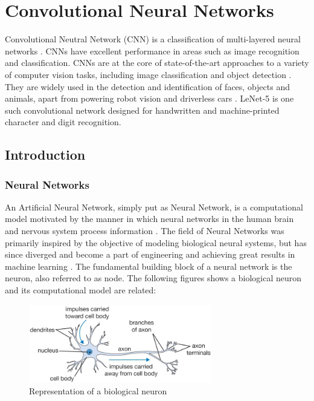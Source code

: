 \chapter{Convolutional Neural Networks}
\label{ch5_cnn}

Convolutional Neutral Network (CNN) is a classification of multi-layered neural networks \cite{cnn_lecun_lenet5}. CNNs have excellent performance in areas such as image recognition and classification.  CNNs are at the core of state-of-the-art approaches to a variety of computer vision tasks, including image classification \cite{kriz_suts_hinton_nips2012} and object detection \cite{gir_don_dar_mal_cvpr2014}. They are widely used in the detection and identification of faces, objects and animals, apart from powering robot vision and driverless cars \cite{cnn_karn}. LeNet-5 is one such convolutional network designed for handwritten and machine-printed character and digit recognition.

\section{Introduction}
\label{sect5_1}

\subsection{Neural Networks}
\label{sect5_1_1}
An Artificial Neural Network, simply put as Neural Network, is a computational model motivated by the manner in which neural networks in the human brain and nervous system process information \cite{cnn_karn}. The field of Neural Networks was primarily inspired by the objective of modeling biological neural systems, but has since diverged and become a part of engineering and achieving great results in machine learning \cite{nn_stanford_1}. \newline\newline The fundamental building block of a neural network is the neuron, also referred to as node. The following figures shows a biological neuron and its computational model are related: \newline

\begin{figure}[h!]
\centering
\includegraphics[width=8cm]{figures/Neuron.png}
\caption{Representation of a biological neuron\cite{nn_stanford_1}}
\label{fig:cnn1}
\end{figure}

